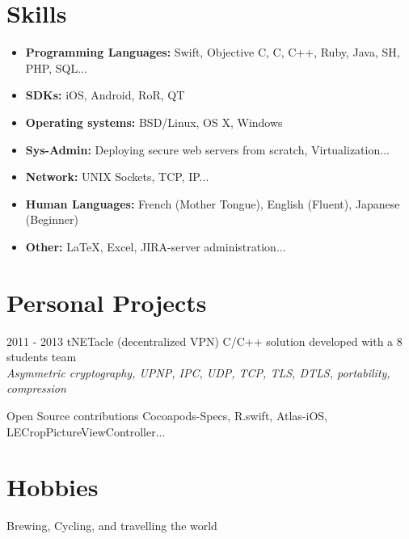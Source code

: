 \documentclass[]{template/friggeri-cv} %
\begin{document}

\section{Skills}

\begin{itemize}
\item \textbf{Programming Languages:} Swift, Objective C, C, C++, Ruby, Java, SH, PHP, SQL...
\item \textbf{SDKs:} iOS, Android, RoR, QT
\item \textbf{Operating systems:} BSD/Linux, OS X, Windows
\item \textbf{Sys-Admin:} Deploying secure web servers from scratch, Virtualization...
\item \textbf{Network:} UNIX Sockets, TCP, IP...
\item \textbf{Human Languages:} French (Mother Tongue), English (Fluent), Japanese (Beginner)
\item \textbf{Other:} \LaTeX, Excel, JIRA-server administration...
\end{itemize}


\section{Personal Projects}
\begin{entrylist}
  \entry
      {2011 - 2013}
      {tNETacle (decentralized VPN)}
      {}
      {C/C++ solution developed with a 8 students team \\
      \emph{Asymmetric cryptography, UPNP, IPC, UDP, TCP, TLS, DTLS, portability, compression}}

\entry
{}
{Open Source contributions}
{}
{Cocoapods-Specs, R.swift, Atlas-iOS, LECropPictureViewController...}


\end{entrylist}


\section{Hobbies}

{Brewing, Cycling, and travelling the world}
\end{document}
